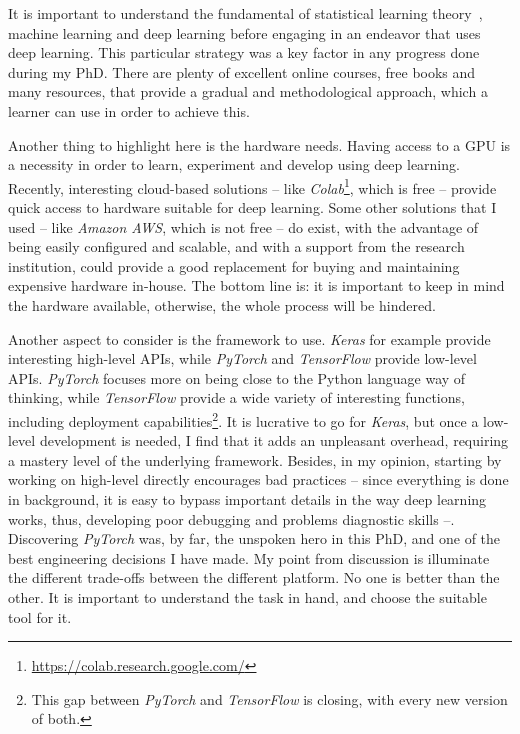     \par It is important to understand the fundamental of statistical learning theory~\citep{hastie01statisticallearning}, machine learning and deep learning before engaging in an endeavor that uses deep learning. This particular strategy was a key factor in any progress done during my PhD. There are plenty of excellent online courses, free books and many resources, that provide a gradual and methodological approach, which a learner can use in order to achieve this.

    \par Another thing to highlight here is the hardware needs. Having access to a GPU is a necessity in order to learn, experiment and develop using deep learning. Recently, interesting cloud-based solutions -- like \textit{Colab}\footnote{\url{https://colab.research.google.com/}}, which is free -- provide quick access to hardware suitable for deep learning. Some other solutions that I used -- like \textit{Amazon AWS}, which is not free -- do exist, with the advantage of being easily configured and scalable, and with a support from the research institution, could provide a good replacement for buying and maintaining expensive hardware in-house. The bottom line is: it is important to keep in mind the hardware available, otherwise, the whole process will be hindered.

    \par Another aspect to consider is the framework to use. \textit{Keras} for example provide interesting high-level APIs, while \textit{PyTorch} and \textit{TensorFlow} provide low-level APIs. \textit{PyTorch} focuses more on being close to the Python language way of thinking, while \textit{TensorFlow} provide a wide variety of interesting functions, including deployment capabilities\footnote{This gap between \textit{PyTorch} and \textit{TensorFlow} is closing, with every new version of both.}. It is lucrative to go for \textit{Keras}, but once a low-level development is needed, I find that it adds an unpleasant overhead, requiring a mastery level of the underlying framework. Besides, in my opinion, starting by working on high-level directly encourages bad practices -- since everything is done in background, it is easy to bypass important details in the way deep learning works, thus, developing poor debugging and problems diagnostic skills --. Discovering \textit{PyTorch} was, by far, the unspoken hero in this PhD, and one of the best engineering decisions I have made. My point from discussion is illuminate the different trade-offs between the different platform. No one is better than the other. It is important to understand the task in hand, and choose the suitable tool for it.

